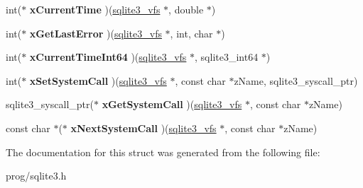 \begin{DoxyCompactItemize}
\mbox{\label{structsqlite3__vfs_a925aa81bcf67f2daf50ad59de850ef41}} 
int($\ast$ {\bfseries x\+Current\+Time} )(\mbox{\hyperlink{structsqlite3__vfs}{sqlite3\+\_\+vfs}} $\ast$, double $\ast$)
\item 
\mbox{\label{structsqlite3__vfs_ae90895f142cc41801f515ae5e339a3d7}} 
int($\ast$ {\bfseries x\+Get\+Last\+Error} )(\mbox{\hyperlink{structsqlite3__vfs}{sqlite3\+\_\+vfs}} $\ast$, int, char $\ast$)
\item 
\mbox{\label{structsqlite3__vfs_a2a344dbc5e4625343d992546fbff5421}} 
int($\ast$ {\bfseries x\+Current\+Time\+Int64} )(\mbox{\hyperlink{structsqlite3__vfs}{sqlite3\+\_\+vfs}} $\ast$, sqlite3\+\_\+int64 $\ast$)
\item 
\mbox{\label{structsqlite3__vfs_a444cd80f79ea4994f72551bb9f403866}} 
int($\ast$ {\bfseries x\+Set\+System\+Call} )(\mbox{\hyperlink{structsqlite3__vfs}{sqlite3\+\_\+vfs}} $\ast$, const char $\ast$z\+Name, sqlite3\+\_\+syscall\+\_\+ptr)
\item 
\mbox{\label{structsqlite3__vfs_a1bf78a1603ab605cd92d146e3f810727}} 
sqlite3\+\_\+syscall\+\_\+ptr($\ast$ {\bfseries x\+Get\+System\+Call} )(\mbox{\hyperlink{structsqlite3__vfs}{sqlite3\+\_\+vfs}} $\ast$, const char $\ast$z\+Name)
\item 
\mbox{\label{structsqlite3__vfs_afbd158883d9bb7954fa7ecd595fe3c2b}} 
const char $\ast$($\ast$ {\bfseries x\+Next\+System\+Call} )(\mbox{\hyperlink{structsqlite3__vfs}{sqlite3\+\_\+vfs}} $\ast$, const char $\ast$z\+Name)
\end{DoxyCompactItemize}


The documentation for this struct was generated from the following file\+:\begin{DoxyCompactItemize}
\item 
prog/sqlite3.\+h\end{DoxyCompactItemize}
